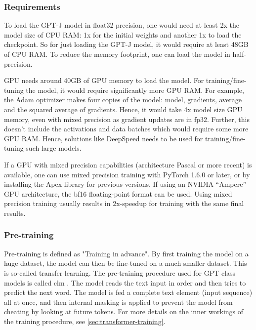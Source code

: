 \subsubsection{Requirements}
\label{sec:requirements}
To load the GPT-J model in float32 precision, one would need at least 2x the model size of CPU RAM: 1x for the initial weights and another 1x to load the checkpoint. So for just loading the GPT-J model, it would require at least 48GB of CPU RAM. To reduce the memory footprint, one can load the model in half-precision.

GPU needs around 40GB of GPU memory to load the model. For training/fine-tuning the model, it would require significantly more GPU RAM. For example, the Adam optimizer makes four copies of the model: model, gradients, average and the squared average of gradients. Hence, it would take 4x model size GPU memory, even with mixed precision as gradient updates are in fp32. Further, this doesn't include the activations and data batches which would require some more GPU RAM. Hence, solutions like DeepSpeed \cite{deepspeed} needs to be used for training/fine-tuning such large models.

If a GPU with mixed precision capabilities (architecture Pascal or more recent) is available, one can use mixed precision training with PyTorch 1.6.0 or later, or by installing the Apex library for previous versions. If using an NVIDIA “Ampere” GPU architecture, the \acrfull{bf16} floating-point format can be used. Using mixed precision training usually results in 2x-speedup for training with the same final results.

\subsubsection{Pre-training}
Pre-training is defined as "Training in advance". By first training the model on a huge dataset, the model can then be fine-tuned on a much smaller dataset. This is so-called transfer learning. The pre-training procedure used for GPT class models is called \acrfull{clm} \cite{radford2018improving}. The model reads the text input in order and then tries to predict the next word. The model is fed a complete text element (input sequence) all at once, and then internal masking is applied to prevent the model from cheating by looking at future tokens. For more details on the inner workings of the training procedure, see \cref{sec:transformer-training}.

